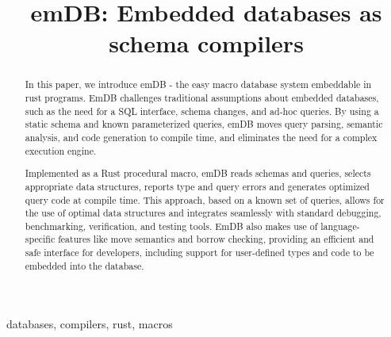 \documentclass[conference]{IEEEtran}
\begin{document}
\title{emDB: Embedded databases as schema compilers %
}

\author{
    \and
    \and
}

\maketitle

\begin{abstract}
    In this paper, we introduce emDB - the easy macro database system embeddable in rust programs. 
    EmDB challenges traditional assumptions about embedded databases, such as the
    need for a SQL interface, schema changes, and ad-hoc queries. By using a static schema and known 
    parameterized queries, emDB moves query parsing, semantic analysis, and code generation to compile 
    time, and eliminates the need for a complex execution engine.

    Implemented as a Rust procedural macro, emDB reads schemas and queries, selects appropriate data
    structures, reports type and query errors and generates optimized query code at compile time. 
    This approach, based on a known set of queries, allows for the use of optimal data structures 
    and integrates seamlessly with standard debugging, benchmarking, verification, and testing tools. 
    EmDB also makes use of language-specific features like move semantics and borrow checking, providing 
    an efficient and safe interface for developers, including support for user-defined types and code to be embedded 
    into the database.
\end{abstract}

\begin{IEEEkeywords}
    databases, compilers, rust, macros
\end{IEEEkeywords}
\end{document}
